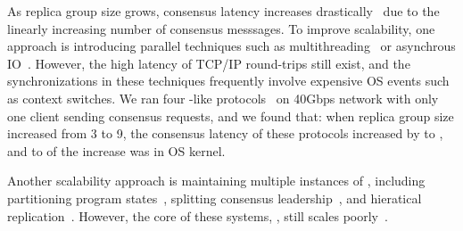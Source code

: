 
As replica group size grows, \paxos consensus latency increases
drastically~\cite{scatter:sosp11} due to the linearly increasing number of 
consensus messsages. To improve scalability,
one approach is introducing parallel techniques such as 
multithreading~\cite{zookeeper, spaxos} or asynchrous IO~\cite{crane:sosp15, 
libpaxos}. However, the high latency of TCP/IP round-trips still exist, and 
the synchronizations in these techniques
frequently involve expensive OS events such as context switches. We ran four
\paxos-like protocols~\cite{zookeeper, crane:sosp15, spaxos, libpaxos} on 40Gbps
network with only one client sending consensus requests, and we found that: when
replica group size increased from 3 to 9, the consensus latency of these
protocols increased by \tradlatencyincreaselow to \tradlatencyincreasehigh, and
\systemcostlow to \systemcosthigh of the increase was in OS kernel.

Another scalability approach is maintaining multiple instances of \paxos, 
including partitioning program states~\cite{scatter:sosp11,dssmr,ssmr},
splitting consensus leadership~\cite{mencius:osdi08,spaxos}, and hieratical
replication~\cite{manos:hotdep10,scatter:sosp11}. However, the core of
these systems, \paxos, still
scales poorly~\cite{ellis:thesis,scatter:sosp11,manos:hotdep10}.





